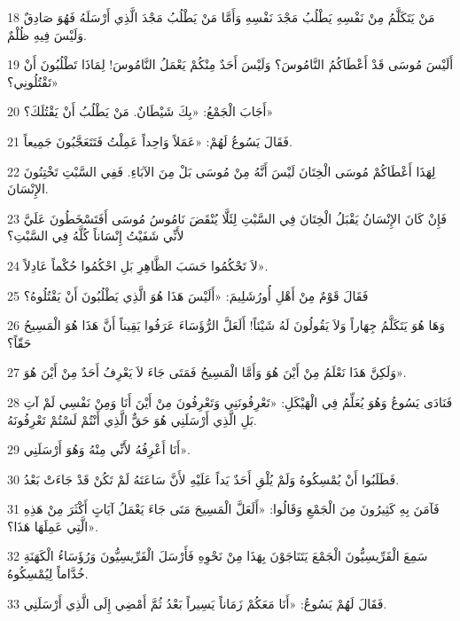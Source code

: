\par 18 مَنْ يَتَكَلَّمُ مِنْ نَفْسِهِ يَطْلُبُ مَجْدَ نَفْسِهِ وَأَمَّا مَنْ يَطْلُبُ مَجْدَ الَّذِي أَرْسَلَهُ فَهُوَ صَادِقٌ وَلَيْسَ فِيهِ ظُلْمٌ.
\par 19 أَلَيْسَ مُوسَى قَدْ أَعْطَاكُمُ النَّامُوسَ؟ وَلَيْسَ أَحَدٌ مِنْكُمْ يَعْمَلُ النَّامُوسَ! لِمَاذَا تَطْلُبُونَ أَنْ تَقْتُلُونِي؟»
\par 20 أَجَابَ الْجَمْعُ: «بِكَ شَيْطَانٌ. مَنْ يَطْلُبُ أَنْ يَقْتُلَكَ؟»
\par 21 فَقَالَ يَسُوعُ لَهُمْ: «عَمَلاً وَاحِداً عَمِلْتُ فَتَتَعَجَّبُونَ جَمِيعاً.
\par 22 لِهَذَا أَعْطَاكُمْ مُوسَى الْخِتَانَ لَيْسَ أَنَّهُ مِنْ مُوسَى بَلْ مِنَ الآبَاءِ. فَفِي السَّبْتِ تَخْتِنُونَ الإِنْسَانَ.
\par 23 فَإِنْ كَانَ الإِنْسَانُ يَقْبَلُ الْخِتَانَ فِي السَّبْتِ لِئَلَّا يُنْقَضَ نَامُوسُ مُوسَى أَفَتَسْخَطُونَ عَلَيَّ لأَنِّي شَفَيْتُ إِنْسَاناً كُلَّهُ فِي السَّبْتِ؟
\par 24 لاَ تَحْكُمُوا حَسَبَ الظَّاهِرِ بَلِ احْكُمُوا حُكْماً عَادِلاً».
\par 25 فَقَالَ قَوْمٌ مِنْ أَهْلِ أُورُشَلِيمَ: «أَلَيْسَ هَذَا هُوَ الَّذِي يَطْلُبُونَ أَنْ يَقْتُلُوهُ؟
\par 26 وَهَا هُوَ يَتَكَلَّمُ جِهَاراً وَلاَ يَقُولُونَ لَهُ شَيْئاً! أَلَعَلَّ الرُّؤَسَاءَ عَرَفُوا يَقِيناً أَنَّ هَذَا هُوَ الْمَسِيحُ حَقّاً؟
\par 27 وَلَكِنَّ هَذَا نَعْلَمُ مِنْ أَيْنَ هُوَ وَأَمَّا الْمَسِيحُ فَمَتَى جَاءَ لاَ يَعْرِفُ أَحَدٌ مِنْ أَيْنَ هُوَ».
\par 28 فَنَادَى يَسُوعُ وَهُوَ يُعَلِّمُ فِي الْهَيْكَلِ: «تَعْرِفُونَنِي وَتَعْرِفُونَ مِنْ أَيْنَ أَنَا وَمِنْ نَفْسِي لَمْ آتِ بَلِ الَّذِي أَرْسَلَنِي هُوَ حَقٌّ الَّذِي أَنْتُمْ لَسْتُمْ تَعْرِفُونَهُ.
\par 29 أَنَا أَعْرِفُهُ لأَنِّي مِنْهُ وَهُوَ أَرْسَلَنِي».
\par 30 فَطَلَبُوا أَنْ يُمْسِكُوهُ وَلَمْ يُلْقِ أَحَدٌ يَداً عَلَيْهِ لأَنَّ سَاعَتَهُ لَمْ تَكُنْ قَدْ جَاءَتْ بَعْدُ.
\par 31 فَآمَنَ بِهِ كَثِيرُونَ مِنَ الْجَمْعِ وَقَالُوا: «أَلَعَلَّ الْمَسِيحَ مَتَى جَاءَ يَعْمَلُ آيَاتٍ أَكْثَرَ مِنْ هَذِهِ الَّتِي عَمِلَهَا هَذَا؟».
\par 32 سَمِعَ الْفَرِّيسِيُّونَ الْجَمْعَ يَتَنَاجَوْنَ بِهَذَا مِنْ نَحْوِهِ فَأَرْسَلَ الْفَرِّيسِيُّونَ وَرُؤَسَاءُ الْكَهَنَةِ خُدَّاماً لِيُمْسِكُوهُ.
\par 33 فَقَالَ لَهُمْ يَسُوعُ: «أَنَا مَعَكُمْ زَمَاناً يَسِيراً بَعْدُ ثُمَّ أَمْضِي إِلَى الَّذِي أَرْسَلَنِي.
